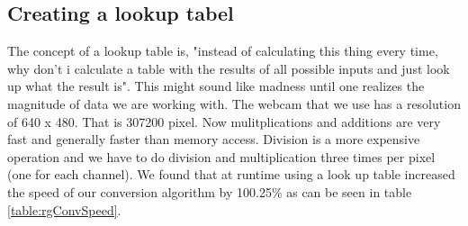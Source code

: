 \subsection{Creating a lookup tabel}
The concept of a lookup table is, "instead of calculating this thing every time, why don't i calculate a table with the results of all possible inputs and just look up what the result is". This might sound like madness until one realizes the magnitude of data we are working with. The webcam that we use has a resolution of 640 x 480. That is 307200 pixel. Now mulitplications and additions are very fast and generally faster than memory access. Division is a more expensive operation and we have to do division and multiplication three times per pixel (one for each channel). We found that at runtime using a look up table increased the speed of our conversion algorithm by 100.25\% as can be seen in table \ref{table:rgConvSpeed}. 


